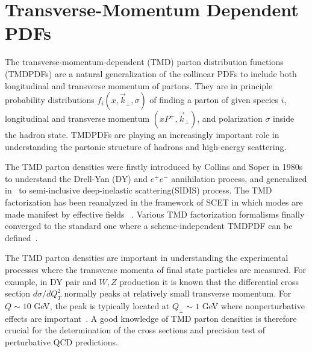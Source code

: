 \section{Transverse-Momentum Dependent PDFs}
\label{sec:tmd}
The transverse-momentum-dependent (TMD) parton distribution functions (TMDPDFs) are a natural generalization
of the collinear PDFs to include both longitudinal and transverse momentum of partons.
They are in principle probability distributions $f_i(x,\vec{k}_\perp,\sigma)$ of finding a parton of given species $i$,
longitudinal and transverse momentum $(xP^+,\vec{k}_{\perp})$, and polarization $\sigma$
inside the hadron state. TMDPDFs are playing an increasingly important role in
understanding the partonic structure of hadrons and high-energy scattering.

The TMD parton densities were firstly introduced by Collins and Soper in 1980s~\cite{Collins:1981uk,Collins:1981va,Collins:1982wa,Collins:1984kg,Collins:1985ue,Bodwin:1984hc} to understand the Drell-Yan (DY) and $e^{+}e^{-}$ annihilation process, and generalized in~\cite{Ji:2004wu,Ji:2004xq} to semi-inclusive deep-inelastic scattering(SIDIS) process. The TMD factorization has been reanalyzed in the framework of SCET in which modes are made manifest by effective fields ~\cite{Bauer:2000yr,Bauer:2001yt,Manohar:2006nz,Becher:2010tm,GarciaEchevarria:2011rb,Echevarria:2012js,Chiu:2012ir}. Various TMD factorization formalisms finally converged to the standard one where a scheme-independent TMDPDF can be defined~\cite{Echevarria:2012js,Collins:2012uy,Collins:2017oxh}.

The TMD parton densities are important in understanding the experimental processes where the transverse momenta of final state particles are measured. For example, in DY pair and $W, Z$ production it is known that the differential cross section $d\sigma/dQ_T^2$ normally peaks at relatively small transverse momentum.  For $Q\sim 10 $ GeV, the peak is typically located at $Q_\perp\sim 1 $ GeV where nonperturbative effects are important~\cite{Collins:1984kg}. A good knowledge of TMD parton densities is therefore crucial for the determination of the
cross sections and precision test of perturbative QCD predictions.

